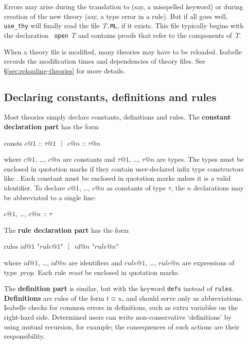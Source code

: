 Errors may arise during the translation to {\ML} (say, a misspelled keyword)
or during creation of the new theory (say, a type error in a rule).  But if
all goes well, {\tt use_thy} will finally read the file {\it T}{\tt.ML}, if
it exists.  This file typically begins with the {\ML} declaration {\tt
open}~$T$ and contains proofs that refer to the components of~$T$.

When a theory file is modified, many theories may have to be reloaded.
Isabelle records the modification times and dependencies of theory files.
See 
%
                 {\S\ref{sec:reloading-theories}}
for more details.


\subsection{Declaring constants, definitions and rules}

Most theories simply declare constants, definitions and rules.  The {\bf
  constant declaration part} has the form
\begin{ttbox}
consts  \(c@1\) :: \(\tau@1\)
        \vdots
        \(c@n\) :: \(\tau@n\)
\end{ttbox}
where $c@1$, \ldots, $c@n$ are constants and $\tau@1$, \ldots, $\tau@n$ are
types.  The types must be enclosed in quotation marks if they contain
user-declared infix type constructors like {\tt *}.  Each
constant must be enclosed in quotation marks unless it is a valid
identifier.  To declare $c@1$, \ldots, $c@n$ as constants of type $\tau$,
the $n$ declarations may be abbreviated to a single line:
\begin{ttbox}
        \(c@1\), \ldots, \(c@n\) :: \(\tau\)
\end{ttbox}
The {\bf rule declaration part} has the form
\begin{ttbox}
rules   \(id@1\) "\(rule@1\)"
        \vdots
        \(id@n\) "\(rule@n\)"
\end{ttbox}
where $id@1$, \ldots, $id@n$ are \ML{} identifiers and $rule@1$, \ldots,
$rule@n$ are expressions of type~$prop$.  Each rule {\em must\/} be
enclosed in quotation marks.

 The {\bf definition part} is similar, but with the
keyword {\tt defs} instead of {\tt rules}.  {\bf Definitions} are rules of the
form $t\equiv u$, and should serve only as abbreviations.  Isabelle checks for
common errors in definitions, such as extra variables on the right-hard side.
Determined users can write non-conservative `definitions' by using mutual
recursion, for example; the consequences of such actions are their
responsibility.


